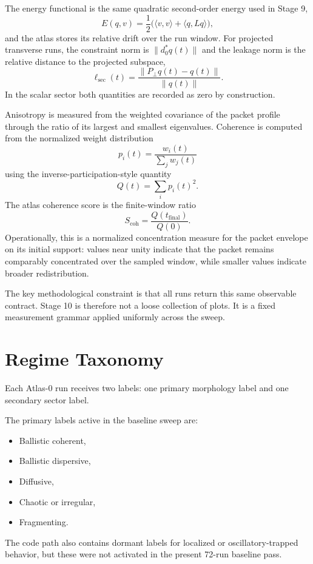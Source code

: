 \documentclass[11pt]{article}
\begin{document}
The energy functional is the same quadratic second-order energy used in Stage 9,
\begin{equation}
E(q,v) = \frac{1}{2}\bigl(\langle v,v\rangle + \langle q,Lq\rangle\bigr),
\end{equation}
and the atlas stores its relative drift over the run window. For projected transverse runs, the constraint norm is $\|d_0^{*}q(t)\|$ and the leakage norm is the relative distance to the projected subspace,
\begin{equation}
\ell_{\mathrm{sec}}(t) = \frac{\|P_{\perp}q(t)-q(t)\|}{\|q(t)\|}.
\end{equation}
In the scalar sector both quantities are recorded as zero by construction.

Anisotropy is measured from the weighted covariance of the packet profile through the ratio of its largest and smallest eigenvalues. Coherence is computed from the normalized weight distribution
\begin{equation}
p_i(t) = \frac{w_i(t)}{\sum_j w_j(t)}
\end{equation}
using the inverse-participation-style quantity
\begin{equation}
Q(t) = \sum_i p_i(t)^2.
\end{equation}
The atlas coherence score is the finite-window ratio
\begin{equation}
S_{\mathrm{coh}} = \frac{Q(t_{\mathrm{final}})}{Q(0)}.
\end{equation}
Operationally, this is a normalized concentration measure for the packet envelope on its initial support: values near unity indicate that the packet remains comparably concentrated over the sampled window, while smaller values indicate broader redistribution.

The key methodological constraint is that all runs return this same observable contract. Stage 10 is therefore not a loose collection of plots. It is a fixed measurement grammar applied uniformly across the sweep.

\section{Regime Taxonomy}
Each Atlas-0 run receives two labels: one primary morphology label and one secondary sector label.

The primary labels active in the baseline sweep are:
\begin{itemize}
\item Ballistic coherent,
\item Ballistic dispersive,
\item Diffusive,
\item Chaotic or irregular,
\item Fragmenting.
\end{itemize}
The code path also contains dormant labels for localized or oscillatory-trapped behavior, but these were not activated in the present 72-run baseline pass.
\end{document}
